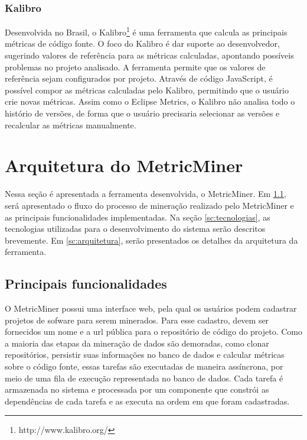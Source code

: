 \documentclass[a4paper, 12pt, twoside]{book}
\begin{document}
    \subsection{Kalibro}
        Desenvolvida no Brasil, o Kalibro\footnote{http://www.kalibro.org/} é uma ferramenta que calcula as principais métricas de código fonte. O foco do Kalibro é dar suporte ao desenvolvedor, sugerindo valores de referência para as métricas calculadas, apontando possíveis problemas no projeto analisado. A ferramenta permite que os valores de referência sejam configurados por projeto. Através de código JavaScript, é possível compor as métricas calculadas pelo Kalibro, permitindo que o usuário crie novas métricas. Assim como o Eclipse Metrics, o Kalibro não analisa todo o histório de versões, de forma que o usuário precisaria selecionar as versões e recalcular as métricas manualmente.
    
\chapter{Arquitetura do MetricMiner} \label{ch:arquitetura}
    Nessa seção é apresentada a ferramenta desenvolvida, o MetricMiner. Em \ref{sc:abordagem}, será apresentado o fluxo do processo de mineração realizado pelo MetricMiner e as principais funcionalidades implementadas. Na seção \ref{sc:tecnologias}, as tecnologias utilizadas para o desenvolvimento do sistema serão descritos brevemente. Em \ref{sc:arquitetura}, serão presentados os detalhes da arquitetura da ferramenta.

    \section{Principais funcionalidades} \label{sc:abordagem}
        O MetricMiner possui uma interface web, pela qual os usuários podem cadastrar projetos de
        sofware para serem minerados. Para esse cadastro, devem ser fornecidos um nome e a url pública para o repositório
        de código do projeto. Como a maioria das etapas da mineração de dados são demoradas, como
        clonar repositórios, persistir suas informações no banco de dados e calcular métricas sobre o
        código fonte, essas tarefas são executadas de maneira assíncrona, por meio 
        de uma fila de execução representada no banco de dados. Cada tarefa é armazenada no sistema e 
        processada por um componente que constrói as dependências de cada tarefa e as executa na 
        ordem em que foram cadastradas.
\end{document}
